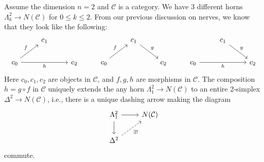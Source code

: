 \begin{example}
    Assume the dimension \(n=2\) and \(\mathcal{C}\) is a category. We have 3 different horns \(\Lambda^2_k\rightarrow N(\mathcal{C})\) for \(0\leq k\leq 2\). From our previous discussion on nerves, we know that they look like the following: 
\[\begin{tikzcd}
	& {c_1} &&& {c_1} &&& {c_1} \\
	{c_0} && {c_2} & {c_0} && {c_2} & {c_0} && {c_2}
	\arrow["g", from=1-5, to=2-6]
	\arrow["g", from=1-8, to=2-9]
	\arrow["f", from=2-1, to=1-2]
	\arrow["h"', from=2-1, to=2-3]
	\arrow["f", from=2-4, to=1-5]
	\arrow["h"', from=2-7, to=2-9]
\end{tikzcd}\]
Here \(c_0,c_1,c_2\) are objects in \(\mathcal{C}\), and \(f,g,h\) are morphisms in \(\mathcal{C}\). The composition \(h=g\circ f\) in \(\mathcal{C}\) uniquely extends the any horn \(\Lambda^2_1\rightarrow N(\mathcal{C})\) to an entire 2-simplex \(\Delta^2\rightarrow N(\mathcal{C})\), i.e., there is a unique dashing arrow making the diagram 
\[\begin{tikzcd}
	{\Lambda^2_1} & {N(\mathcal{C})} \\
	{\Delta^2}
	\arrow[from=1-1, to=1-2]
	\arrow[from=1-1, to=2-1]
	\arrow["{\exists !}"', dashed, from=2-1, to=1-2]
\end{tikzcd}\]
commute. 
\end{example}